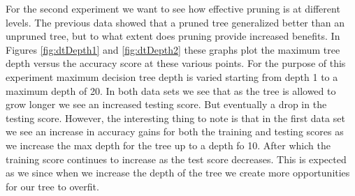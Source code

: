\documentclass[
	letterpaper, %
]{IEEEtran}
\begin{document}
		For the second experiment we want to see how effective pruning is at different levels. The previous data showed that a pruned tree generalized better than an unpruned tree, but to what extent does pruning provide increased benefits. In Figures \ref{fig:dtDepth1} and \ref{fig:dtDepth2} these graphs plot the maximum tree depth versus the accuracy score at these various points. For the purpose of this experiment maximum decision tree depth is varied starting from depth 1 to a maximum depth of 20. In both data sets we see that as the tree is allowed to grow longer we see an increased testing score. But eventually a drop in the testing score. However, the interesting thing to note is that in the first data set we see an increase in accuracy gains for both the training and testing scores as we increase the max depth for the tree up to a depth fo 10. After which the training score continues to increase as the test score decreases. This is expected as we since when we increase the depth of the tree we create more opportunities for our tree to overfit.
	
\end{document}
